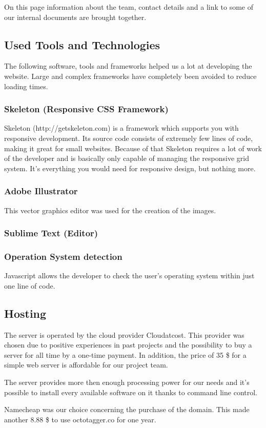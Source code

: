 On this page information about the team, contact details and a link to some of our internal documents are brought together. 

\subsection{Used Tools and Technologies}

The following software, tools and frameworks helped us a lot at developing the website. Large and complex frameworks have completely been avoided to reduce loading times.


\subsubsection{Skeleton (Responsive CSS Framework)}
\label{sec:Skeleton}

Skeleton (http://getskeleton.com) is a framework which supports you with responsive development. Its source code consists of extremely few lines of code, making it great for small websites. Because of that Skeleton requires a lot of work of the developer and is basically only capable of managing the responsive grid system. It's everything you would need for responsive design, but nothing more.

\subsubsection{Adobe Illustrator}

This vector graphics editor was used for the creation of the images. 

\subsubsection{Sublime Text (Editor)}

\subsubsection{Operation System detection}
\label{sec:OSdetection}

Javascript allows the developer to check the user's operating system within just one line of code.



\subsection{Hosting}

The server is operated by the cloud provider Cloudatcost. This provider was chosen due to positive experiences in past projects and the possibility to buy a server for all time by a one-time payment. In addition, the price of 35 \$ for a simple web server is affordable for our project team. 

The server provides more then enough processing power for our needs and it's possible to install every available software on it thanks to command line control.

Namecheap was our choice concerning the purchase of the domain. This made another 8.88 \$ to use octotagger.co for one year.
